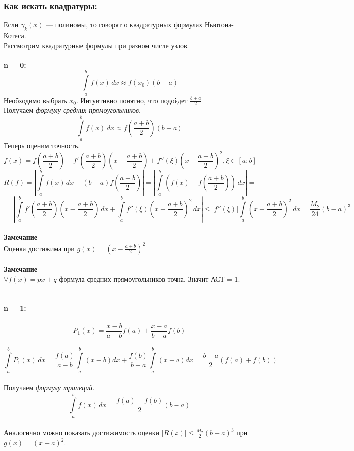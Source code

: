 \subsubsection{Как искать квадратуры:}
Если $\gamma_k(x)$ --- полиномы, то говорят о квадратурных формулах Ньютона-Котеса.\\
Рассмотрим квадратурные формулы при разном числе узлов.\\
\\
\textbf{n = 0:}\\
\[
\int\limits_{a}^{b} f(x) \, dx  \approx f(x_0)(b-a)
\]
Необходимо выбрать $x_0$. Интуитивно понятно, что подойдет $\frac{b+a}{2}$\\
Получаем \textit{формулу средних прямоугольников}.\\
\[
\int\limits_{a}^{b} f(x) \, dx  \approx f(\frac{a+b}{2})(b-a)
\]
Теперь оценим точность.\\
\[
f(x) = f(\frac{a+b}{2}) +f'(\frac{a+b}{2})(x- \frac{a+b}{2}) + f''(\xi)(x- \frac{a+b}{2})^2 , \xi \in [a;b]
\]
\[
R(f) = |\int\limits_{a}^{b} f(x) \, dx  - (b-a)f(\frac{a+b}{2})| = |\int\limits_{a}^{b} (f(x)-f(\frac{a+b}{2})) \, dx| =
\]
\[ = |\int\limits_{a}^{b} f'(\frac{a+b}{2})(x-\frac{a+b}{2}) \, dx + \int\limits_{a}^{b} f''(\xi)(x- \frac{a+b}{2})^2 \, dx| \leq |f''(\xi)|\int\limits_{a}^{b}(x- \frac{a+b}{2})^2 \, dx = \frac{M_2}{24}(b-a)^3
\]\\
\textbf{Замечание}\\
Оценка достижима при $g(x) = (x-\frac{a+b}{2})^2$\\
\\
\textbf{Замечание}\\
$\forall f(x) = px + q$ формула средних прямоугольников точна. Значит АСТ = 1.\\
\\
\\
\textbf{n = 1:}\\
\\
\[P_1(x) = \frac{x-b}{a-b}f(a) + \frac{x-a}{b-a}f(b)\]\\
\[
\int\limits_{a}^{b} P_1(x) \, dx = \frac{f(a)}{a-b}\int\limits_{a}^{b}(x-b)dx + \frac{f(b)}{b-a}\int\limits_{a}^{b}(x-a)dx = \frac{b-a}{2}(f(a) + f(b))
\]\\
Получаем \textit{формулу трапеций}.\\
\[
\int\limits_{a}^{b} f(x) \, dx = \frac{f(a)+f(b)}{2}(b-a)
\]\\
Аналогично можно показать достижимость оценки $|R(x)| \leq \frac{M_2}{2}(b-a)^3$ при $g(x) = (x-a)^2$.\\
